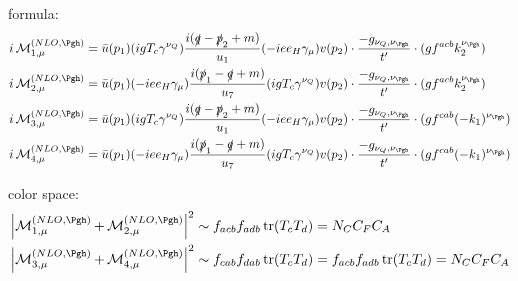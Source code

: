 formula:
\begin{align}
i\Md^{(NLO,\Pgh)}_{1,\mu} &= \bar u(p_1)( igT_c\gamma^{\nu_Q})\frac{i(\slashed{q}-\slashed{p}_2+m)}{u_1}(-i e e_H \gamma_\mu) v(p_2)\cdot\frac{-g_{\nu_Q,\nu_{\Pgh}}}{t'} \cdot (gf^{acb}k_2^{\nu_{\Pgh}})\\
i\Md^{(NLO,\Pgh)}_{2,\mu} &= \bar u(p_1)(-i e e_H \gamma_\mu) \frac{i(\slashed{p}_1-\slashed{q}+m)}{u_7}( igT_c\gamma^{\nu_Q})v(p_2)\cdot\frac{-g_{\nu_Q,\nu_{\Pgh}}}{t'} \cdot (gf^{acb}k_2^{\nu_{\Pgh}})\\
i\Md^{(NLO,\Pgh)}_{3,\mu} &= \bar u(p_1)( igT_c\gamma^{\nu_Q})\frac{i(\slashed{q}-\slashed{p}_2+m)}{u_1}(-i e e_H \gamma_\mu) v(p_2)\cdot\frac{-g_{\nu_Q,\nu_{\Pgh}}}{t'} \cdot (gf^{cab}(-k_1)^{\nu_{\Pgh}})\\
i\Md^{(NLO,\Pgh)}_{4,\mu} &= \bar u(p_1)(-i e e_H \gamma_\mu) \frac{i(\slashed{p}_1-\slashed{q}+m)}{u_7}( igT_c\gamma^{\nu_Q})v(p_2)\cdot\frac{-g_{\nu_Q,\nu_{\Pgh}}}{t'} \cdot (gf^{cab}(-k_1)^{\nu_{\Pgh}})
\end{align}

color space:
\begin{align}
\abs{\Md^{(NLO,\Pgh)}_{1,\mu}+\Md^{(NLO,\Pgh)}_{2,\mu}}^2 &\sim f_{acb}f_{adb}\tr(T_cT_d) = N_C C_F C_A\\
\abs{\Md^{(NLO,\Pgh)}_{3,\mu}+\Md^{(NLO,\Pgh)}_{4,\mu}}^2 &\sim f_{cab}f_{dab}\tr(T_c T_d) = f_{acb}f_{adb}\tr(T_cT_d) = N_C C_F C_A
\end{align}
